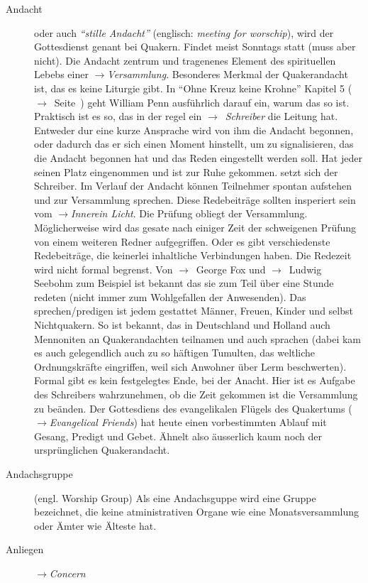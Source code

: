 \begin{description}
 \item[Andacht] oder auch \textit{"`stille Andacht"'} (englisch: \textit{meeting
for worschip}), wird der Gottesdienst genant bei Quakern. Findet meist Sonntags
statt (muss aber nicht). Die Andacht zentrum und tragenenes Element des
spirituellen Lebebs einer $\to$\textit{Versammlung}. Besonderes Merkmal der
Quakerandacht ist, das es keine Liturgie gibt. In "`Ohne Kreuz keine Krohne"'
Kapitel 5 ($\to$~Seite~\pageref{kap5_ab1}) geht William Penn ausführlich darauf
ein, warum das so ist. Praktisch ist es so, das in der regel ein
$\to$~\textit{Schreiber} die Leitung hat. Entweder dur eine kurze Ansprache wird
von ihm die Andacht begonnen, oder dadurch das er sich einen Moment hinstellt,
um zu signalisieren, das die Andacht begonnen hat und das Reden eingestellt
werden soll. Hat jeder seinen Platz eingenommen und ist zur Ruhe gekommen. setzt
sich der Schreiber. Im Verlauf der Andacht können Teilnehmer spontan aufstehen
und zur Versammlung sprechen. Diese Redebeiträge sollten insperiert sein vom
$\to$\textit{Innerein Licht}. Die Prüfung obliegt der Versammlung.
Möglicherweise wird das gesate nach einiger Zeit der schweigenen Prüfung von
einem weiteren Redner aufgegriffen. Oder es gibt verschiedenste Redebeiträge,
die keinerlei inhaltliche Verbindungen haben. Die Redezeit wird nicht formal
begrenst. Von $\to$~George Fox und $\to$~Ludwig Seebohm zum Beispiel ist bekannt
das sie zum Teil über eine Stunde redeten (nicht immer zum Wohlgefallen der
Anwesenden). Das sprechen/predigen ist jedem gestattet Männer, Freuen, Kinder
und selbst Nichtquakern. So ist bekannt, das in Deutschland und Holland auch
Mennoniten an Quakerandachten teilnamen und auch sprachen (dabei kam es auch
gelegendlich auch zu so häftigen Tumulten, das weltliche Ordnungskräfte
eingriffen, weil sich Anwohner über Lerm beschwerten). Formal gibt es kein
festgelegtes Ende, bei der Anacht. Hier ist es Aufgabe des Schreibers
wahrzunehmen, ob die Zeit gekommen ist die Versammlung zu beänden.  Der
Gottesdiens des evangelikalen Flügels des Quakertums ($\to$\textit{Evangelical
Friends}) hat heute einen vorbestimmten Ablauf mit Gesang, Predigt und Gebet.
Ähnelt also äusserlich kaum noch der ursprünglichen Quakerandacht.

 \item[Andachsgruppe] (engl. Worship Group) Als eine Andachsguppe wird eine
 Gruppe bezeichnet, die keine atministrativen Organe wie eine Monatsversammlung
 oder Ämter wie Älteste hat.

 \item[Anliegen] $\to$\textit{Concern}


 \end{description}
\normalsize
